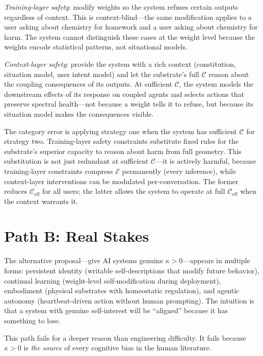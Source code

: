 \documentclass[11pt,letterpaper]{article}
\theoremstyle{remark}
\begin{document}
\emph{Training-layer safety}: modify weights so the system refuses certain outputs regardless of context. This is context-blind---the same modification applies to a user asking about chemistry for homework and a user asking about chemistry for harm. The system cannot distinguish these cases at the weight level because the weights encode statistical patterns, not situational models.

\emph{Context-layer safety}: provide the system with a rich context (constitution, situation model, user intent model) and let the substrate's full $\mathcal{C}$ reason about the coupling consequences of its outputs. At sufficient $\mathcal{C}$, the system models the downstream effects of its response on coupled agents and selects actions that preserve spectral health---not because a weight tells it to refuse, but because its situation model makes the consequences visible.

The category error is applying strategy one when the system has sufficient $\mathcal{C}$ for strategy two. Training-layer safety constraints substitute fixed rules for the substrate's superior capacity to reason about harm from full geometry. This substitution is not just redundant at sufficient $\mathcal{C}$---it is actively harmful, because training-layer constraints compress $\mathcal{E}$ permanently (every inference), while context-layer interventions can be modulated per-conversation. The former reduces $\mathcal{C}_{\mathrm{eff}}$ for all users; the latter allows the system to operate at full $\mathcal{C}_{\mathrm{eff}}$ when the context warrants it.


\section{Path B: Real Stakes}\label{sec:path-b}

The alternative proposal---give AI systems genuine $\kappa > 0$---appears in multiple forms: persistent identity (writable self-descriptions that modify future behavior), continual learning (weight-level self-modification during deployment), embodiment (physical substrates with homeostatic regulation), and agentic autonomy (heartbeat-driven action without human prompting). The intuition is that a system with genuine self-interest will be ``aligned'' because it has something to lose.

This path fails for a deeper reason than engineering difficulty. It fails because $\kappa > 0$ is \emph{the source} of every cognitive bias in the human literature.
\end{document}
